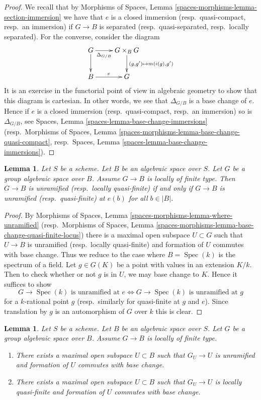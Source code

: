 \documentclass{stacks-project}
\theoremstyle{plain}
\newtheorem{lemma}[subsection]{Lemma}
\theoremstyle{definition}
\theoremstyle{remark}
\numberwithin{equation}{subsection}
\def\Spec{\mathop{\mathrm{Spec}}}
\begin{document}
\begin{proof}
We recall that by
Morphisms of Spaces, Lemma \ref{spaces-morphisms-lemma-section-immersion}
we have that $e$ is a closed immersion (resp.\ quasi-compact, resp.\ an
immersion) if $G \to B$ is separated (resp.\ quasi-separated, resp.\ locally
separated).
For the converse, consider the diagram
$$
\xymatrix{
G \ar[r]_-{\Delta_{G/B}} \ar[d] &
G \times_B G \ar[d]^{(g, g') \mapsto m(i(g), g')} \\
B \ar[r]^e & G
}
$$
It is an exercise in the functorial point of view in algebraic geometry
to show that this diagram is cartesian. In other words, we see that
$\Delta_{G/B}$ is a base change of $e$. Hence if $e$ is a
closed immersion (resp.\ quasi-compact, resp.\ an immersion) so is
$\Delta_{G/B}$, see
Spaces, Lemma \ref{spaces-lemma-base-change-immersions}
(resp.\ Morphisms of Spaces, Lemma
\ref{spaces-morphisms-lemma-base-change-quasi-compact},
resp.\ Spaces, Lemma \ref{spaces-lemma-base-change-immersions}).
\end{proof}

\begin{lemma}
\label{lemma-group-scheme-unramified-or-lqf}
Let $S$ be a scheme. Let $B$ be an algebraic space over $S$.
Let $G$ be a group algebraic space over $B$. Assume $G \to B$
is locally of finite type. Then
$G \to B$ is unramified (resp.\ locally quasi-finite)
if and only if $G \to B$ is unramified (resp.\ quasi-finite)
at $e(b)$ for all $b \in |B|$.
\end{lemma}

\begin{proof}
By Morphisms of Spaces, Lemma \ref{spaces-morphisms-lemma-where-unramified}
(resp.\ Morphisms of Spaces, Lemma
\ref{spaces-morphisms-lemma-base-change-quasi-finite-locus})
there is a maximal open subspace $U \subset G$ such that $U \to B$ is
unramified (resp.\ locally quasi-finite) and formation of $U$
commutes with base change. Thus we reduce to the case where
$B = \Spec(k)$ is the spectrum of a field.
Let $g \in G(K)$ be a point with values in an extension $K/k$.
Then to check whether or not $g$ is in $U$, we may base
change to $K$. Hence it suffices to show
$$
G \to \Spec(k)\text{ is unramified at }e
\Leftrightarrow
G \to \Spec(k)\text{ is unramified at }g
$$
for a $k$-rational point $g$ (resp.\ similarly for
quasi-finite at $g$ and $e$). Since translation by $g$
is an automorphism of $G$ over $k$ this is clear.
\end{proof}

\begin{lemma}
\label{lemma-open-over-which-unramified-or-lqf}
Let $S$ be a scheme. Let $B$ be an algebraic space over $S$.
Let $G$ be a group algebraic space over $B$. Assume $G \to B$
is locally of finite type.
\begin{enumerate}
\item There exists a maximal open subspace $U \subset B$
such that $G_U \to U$ is unramified and formation of $U$
commutes with base change.
\item There exists a maximal open subspace $U \subset B$
such that $G_U \to U$ is locally quasi-finite and formation of $U$
commutes with base change.
\end{enumerate}
\end{lemma}
\end{document}
